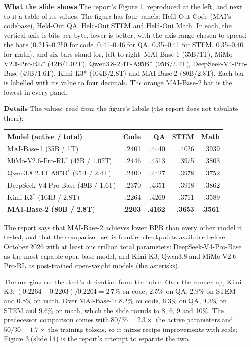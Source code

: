 \documentclass[11pt,letterpaper]{article}
\newcommand{\para}[1]{\medskip\noindent\textbf{#1}\quad}
\begin{document}
\para{What the slide shows} The report's Figure 1, reproduced at the left, and next to it a table of its values. The figure has four panels: Held-Out Code (MAI's codebase), Held-Out QA, Held-Out STEM and Held-Out Math. In each, the vertical axis is bits per byte, lower is better, with the axis range chosen to spread the bars (0.215--0.250 for code, 0.41--0.46 for QA, 0.35--0.41 for STEM, 0.35--0.40 for math), and six bars stand for, left to right, MAI-Base-1 (35B/1T), MiMo-V2.6-Pro-RL* (42B/1.02T), Qwen3.8-2.4T-A95B* (95B/2.4T), DeepSeek-V4-Pro-Base (49B/1.6T), Kimi K3* (104B/2.8T) and MAI-Base-2 (80B/2.8T). Each bar is labelled with its value to four decimals. The orange MAI-Base-2 bar is the lowest in every panel.

\para{Details} The values, read from the figure's labels (the report does not tabulate them):
\begin{center}\small
\begin{tabular}{@{}lrrrr@{}}
\toprule
Model (active / total) & Code & QA & STEM & Math\\
\midrule
MAI-Base-1 (35B / 1T) & .2401 & .4440 & .4026 & .3939\\
MiMo-V2.6-Pro-RL$^*$ (42B / 1.02T) & .2446 & .4513 & .3975 & .3803\\
Qwen3.8-2.4T-A95B$^*$ (95B / 2.4T) & .2400 & .4427 & .3978 & .3752\\
DeepSeek-V4-Pro-Base (49B / 1.6T) & .2370 & .4351 & .3968 & .3862\\
Kimi K3$^*$ (104B / 2.8T) & .2264 & .4269 & .3761 & .3589\\
\textbf{MAI-Base-2 (80B / 2.8T)} & \textbf{.2203} & \textbf{.4162} & \textbf{.3653} & \textbf{.3561}\\
\bottomrule
\end{tabular}
\end{center}
The report says that MAI-Base-2 achieves lower BPB than every other model it tested, and that the comparison set is frontier checkpoints available before October 2026 with at least one trillion total parameters: DeepSeek-V4-Pro-Base as the most capable open base model, and Kimi K3, Qwen3.8 and MiMo-V2.6-Pro-RL as post-trained open-weight models (the asterisks).

The margins are the deck's derivation from the table. Over the runner-up, Kimi K3: $(0.2264-0.2203)/0.2264=2.7\%$ on code, $2.5\%$ on QA, $2.9\%$ on STEM and $0.8\%$ on math. Over MAI-Base-1: $8.2\%$ on code, $6.3\%$ on QA, $9.3\%$ on STEM and $9.6\%$ on math, which the slide rounds to 8, 6, 9 and 10\%. The predecessor comparison comes with $80/35=2.3\times$ the active parameters and $50/30=1.7\times$ the training tokens, so it mixes recipe improvements with scale; Figure 3 (slide 14) is the report's attempt to separate the two.
\end{document}
